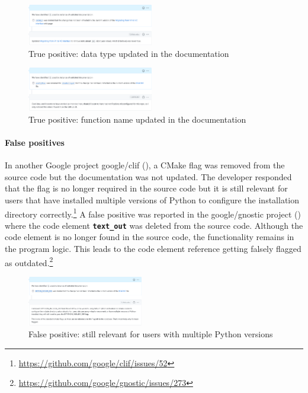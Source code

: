 \documentclass[conference]{IEEEtran}
\newcommand{\codeword}[1]{\texttt{\textbf{\footnotesize#1}}}
\begin{document}
\begin{figure}[htbp]
    \centering
    \includegraphics[width=0.49\textwidth]{google_cctz.png}
    \caption{True positive: data type updated in the documentation}
    \label{fig:cctz}
\end{figure}

\begin{figure}[htbp]
    \centering
    \includegraphics[width=0.49\textwidth]{google_hs-portray.png}
    \caption{True positive: function name updated in the documentation}
    \label{fig:hs-portray}
\end{figure}

\paragraph{False positives} In another Google project google/clif (), a CMake flag was removed from the source code but the documentation was not updated. The developer responded that the flag is no longer required in the source code but it is still relevant for users that have installed multiple versions of Python to configure the installation directory correctly.\footnote{\url{https://github.com/google/clif/issues/52}} A false positive was reported in the google/gnostic project () where the code element \codeword{text\_out} was deleted from the source code. Although the code element is no longer found in the source code, the functionality remains in the program logic. This leads to the code element reference getting falsely flagged as outdated.\footnote{\url{https://github.com/google/gnostic/issues/273}}

\begin{figure}[htbp]
    \centering
    \includegraphics[width=0.45\textwidth]{google_clif.png}
    \caption{False positive: still relevant for users with multiple Python versions}
    \label{fig:clif}
\end{figure}
\end{document}
